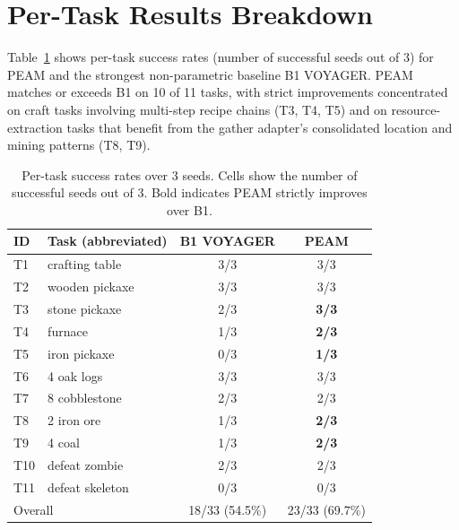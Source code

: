 \documentclass[11pt]{article}
\begin{document}
\section{Per-Task Results Breakdown}
\label{app:per_task_results}

Table~\ref{tab:per_task} shows per-task success rates
(number of successful seeds out of 3) for PEAM and the
strongest non-parametric baseline B1 VOYAGER. PEAM matches
or exceeds B1 on 10 of 11 tasks, with strict improvements
concentrated on craft tasks involving multi-step recipe
chains (T3, T4, T5) and on resource-extraction tasks that
benefit from the gather adapter's consolidated location and
mining patterns (T8, T9).

\begin{table}[h]
\centering
\small
\setlength{\tabcolsep}{4pt}
\caption{Per-task success rates over 3 seeds. Cells show
the number of successful seeds out of 3. Bold indicates
PEAM strictly improves over B1.}
\label{tab:per_task}
\begin{tabular}{llcc}
\toprule
ID & Task (abbreviated) & B1 VOYAGER & PEAM \\
\midrule
T1  & crafting table     & 3/3 & 3/3 \\            %
T2  & wooden pickaxe     & 3/3 & 3/3 \\            %
T3  & stone pickaxe      & 2/3 & \textbf{3/3} \\   %
T4  & furnace            & 1/3 & \textbf{2/3} \\   %
T5  & iron pickaxe       & 0/3 & \textbf{1/3} \\   %
T6  & 4 oak logs         & 3/3 & 3/3 \\            %
T7  & 8 cobblestone      & 2/3 & 2/3 \\            %
T8  & 2 iron ore         & 1/3 & \textbf{2/3} \\   %
T9  & 4 coal             & 1/3 & \textbf{2/3} \\   %
T10 & defeat zombie      & 2/3 & 2/3 \\            %
T11 & defeat skeleton    & 0/3 & 0/3 \\            %
\midrule
\multicolumn{2}{l}{Overall} & 18/33 (54.5\%) & 23/33 (69.7\%) \\
\bottomrule
\end{tabular}
\end{table}
\end{document}
